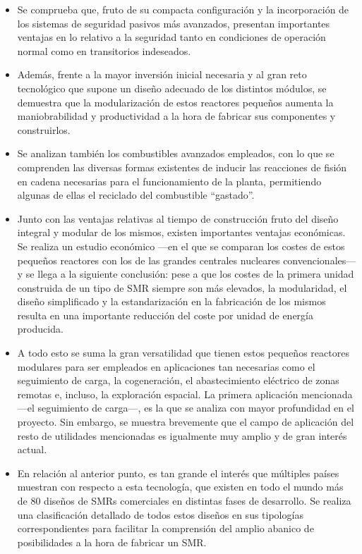 \documentclass[a4paper, 11pt, spanish, twoside]{article}
\begin{document}
\begin{itemize}
    \item Se comprueba que, fruto de su compacta configuración y la incorporación de los sistemas de seguridad pasivos más avanzados, presentan importantes ventajas en lo relativo a la seguridad tanto en condiciones de operación normal como en transitorios indeseados.
    \item Además, frente a la mayor inversión inicial necesaria y al gran reto tecnológico que supone un diseño adecuado de los distintos módulos, se demuestra que la modularización de estos reactores pequeños aumenta la maniobrabilidad y productividad a la hora de fabricar sus componentes y construirlos.
    \item Se analizan también los combustibles avanzados empleados, con lo que se comprenden las diversas formas existentes de inducir las reacciones de fisión en cadena necesarias para el funcionamiento de la planta, permitiendo algunas de ellas el reciclado del combustible ``gastado''.
    \item Junto con las ventajas relativas al tiempo de construcción fruto del diseño integral y modular de los mismos, existen importantes ventajas económicas. Se realiza un estudio económico ---en el que se comparan los costes de estos pequeños reactores con los de las grandes centrales nucleares convencionales--- y se llega a la siguiente conclusión: pese a que los costes de la primera unidad construida de un tipo de SMR siempre son más elevados, la modularidad, el diseño simplificado y la estandarización en la fabricación de los mismos resulta en una importante reducción del coste por unidad de energía producida.
    \item A todo esto se suma la gran versatilidad que tienen estos pequeños reactores modulares para ser empleados en aplicaciones tan necesarias como el seguimiento de carga, la cogeneración, el abastecimiento eléctrico de zonas remotas e, incluso, la exploración espacial. La primera aplicación mencionada ---el seguimiento de carga---, es la que se analiza con mayor profundidad en el proyecto. Sin embargo, se muestra brevemente que el campo de aplicación del resto de utilidades mencionadas es igualmente muy amplio y de gran interés actual.
    \item En relación al anterior punto, es tan grande el interés que múltiples países muestran con respecto a esta tecnología, que existen en todo el mundo más de 80 diseños de SMRs comerciales en distintas fases de desarrollo. Se  realiza una clasificación detallado de todos estos diseños en sus tipologías correspondientes para facilitar la comprensión del amplio abanico de posibilidades a la hora de fabricar un SMR.
    

\end{itemize}
\end{document}
